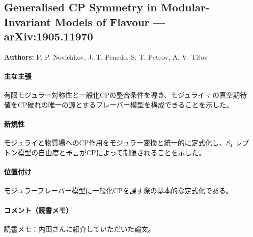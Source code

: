 \subsection{Generalised CP Symmetry in Modular-Invariant Models of Flavour --- arXiv:1905.11970}

\textbf{Authors:} P. P. Novichkov, J. T. Penedo, S. T. Petcov, A. V. Titov

\paragraph{主な主張}
有限モジュラー対称性と一般化CPの整合条件を導き、モジュライ $\tau$ の真空期待値をCP破れの唯一の源とするフレーバー模型を構成できることを示した\cite{Novichkov:2019sqv}。

\paragraph{新規性}
モジュライと物質場へのCP作用をモジュラー変換と統一的に定式化し、$S_4$ レプトン模型の自由度と予言がCPによって制限されることを示した。

\paragraph{位置付け}
モジュラーフレーバー模型に一般化CPを課す際の基本的な定式化である。

\paragraph{コメント（読書メモ）}
読書メモ：内田さんに紹介していただいた論文。

